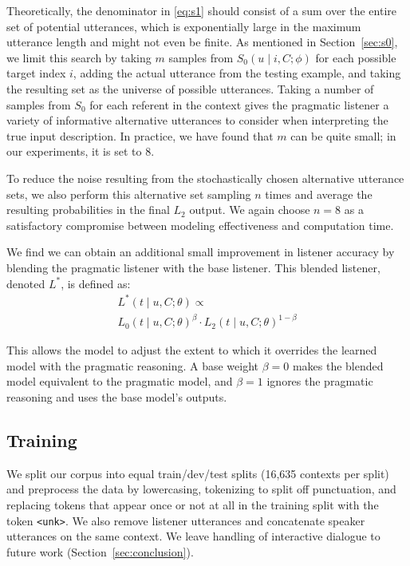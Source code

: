 \documentclass[11pt,letterpaper]{article}
\newcommand{\Listener}{L}
\newcommand{\Speaker}{S}
\newcommand{\utt}{u}
\newcommand{\context}{C}
\newcommand{\target}{t}
\newcommand{\numsamples}{m}
\renewcommand{\|}{\mid}
\newcommand{\secref}[1]{Section~\ref{#1}}
\begin{document}
Theoretically, the denominator in \eqref{eq:s1} should consist of a sum over
the entire set of potential utterances, which is exponentially large in the
maximum utterance length and might not even be finite.
As mentioned in \secref{sec:s0}, we limit this search by
taking $\numsamples$ samples from $\Speaker_0(\utt \| i, \context; \phi)$ for
each possible target index $i$, adding the actual utterance from the testing example,
and taking the resulting set as the universe of possible utterances. Taking a number
of samples from $\Speaker_0$ for each referent in the context gives the pragmatic
listener a variety of informative alternative utterances to consider when
interpreting the true input description. In practice, we have found that $\numsamples$
can be quite small; in our experiments, it is set to $8$.

To reduce the noise
resulting from the stochastically chosen alternative utterance sets, we also perform
this alternative set sampling $n$ times and average the resulting probabilities in
the final $\Listener_2$ output. We again choose $n = 8$ as a satisfactory
compromise between modeling effectiveness and computation time.

We find we can obtain an additional small improvement in listener accuracy
by blending the pragmatic listener with the base listener. This blended listener,
denoted $\Listener^*$, is defined as:
\begin{multline}
\Listener^{*}(\target \| \utt, \context; \theta) \propto \\ {\Listener_0}(\target \| \utt, \context; \theta)^{\beta} \cdot {}
\Listener_2(\target \| \utt, \context; \theta)^{1-\beta}  \label{eq:beta}
\end{multline}

This allows the model to adjust the extent to which it overrides the learned model
with the pragmatic reasoning. A base weight $\beta = 0$ makes the blended model
equivalent to the pragmatic model, and $\beta = 1$ ignores the pragmatic reasoning
and uses the base model's outputs.

\subsection{Training} \label{sec:training}

We split our corpus into equal train/dev/test splits (16,635 contexts per split)
and preprocess the data by lowercasing, tokenizing
to split off punctuation, and replacing tokens that appear once or not at all
in the training split with the token \texttt{<unk>}. We also remove
listener utterances and concatenate speaker utterances on the same context.
We leave handling of interactive dialogue to future work (\secref{sec:conclusion}).
\end{document}
